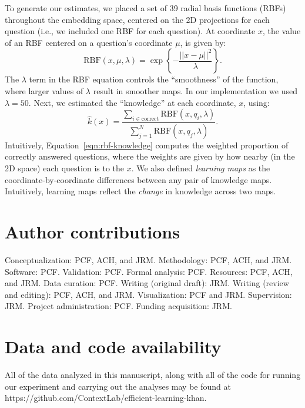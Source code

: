 \documentclass[10pt]{article}
\begin{document}
To generate our estimates, we placed a set of 39 radial basis functions (RBFs)
throughout the embedding space, centered on the 2D projections for each
question (i.e., we included one RBF for each question). At coordinate $x$, the
value of an RBF centered on a question's coordinate $\mu$, is given by:
\begin{equation}
    \mathrm{RBF}(x, \mu, \lambda) = \exp\left\{-\frac{||x - \mu||^2}{\lambda}\right\}.
    \label{eqn:rbf}
\end{equation}
The $\lambda$ term in the RBF equation controls the ``smoothness'' of the
function, where larger values of $\lambda$ result in smoother maps. In our
implementation we used $\lambda = 50$.  Next, we estimated the ``knowledge''
at each coordinate, $x$, using:
\begin{equation}
    \hat{k}(x) = \frac{\sum_{i \in \mathrm{correct}} \mathrm{RBF}(x, q_i, \lambda)}{\sum_{j = 1}^N \mathrm{RBF}(x, q_j, \lambda)}.
    \label{eqn:rbf-knowledge}
\end{equation}
Intuitively, Equation~\ref{eqn:rbf-knowledge} computes the weighted proportion of
correctly answered questions, where the weights are given by how nearby (in the 2D space)
each question is to the $x$.  We also defined \textit{learning maps} as the coordinate-by-coordinate
differences between any pair of knowledge maps.  Intuitively, learning maps reflect the \textit{change}
in knowledge across two maps.

\section*{Author contributions}

Conceptualization: PCF, ACH, and JRM. Methodology: PCF, ACH, and JRM. Software:
PCF. Validation: PCF. Formal analysis: PCF. Resources: PCF, ACH, and JRM. Data
curation: PCF. Writing (original draft): JRM. Writing (review and editing):
PCF, ACH, and JRM. Visualization: PCF and JRM. Supervision: JRM. Project
administration: PCF. Funding acquisition: JRM.


\section*{Data and code availability}

All of the data analyzed in this manuscript, along with all of the code for
running our experiment and carrying out the analyses may be found at
https://github.com/Con\-text\-Lab/eff\-ic\-ient-learn\-ing-khan.
\end{document}
